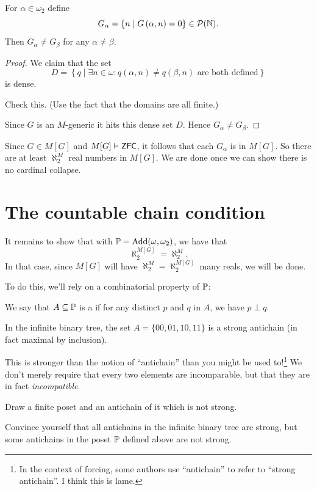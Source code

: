 \begin{lemma}
	For $\alpha \in \omega_2$ define
	\[ G_\alpha = \left\{ n \mid G\left( \alpha,n \right) = 0 \right\} \in \mathcal P(\mathbb N). \]
	Then $G_\alpha \neq G_\beta$ for any $\alpha \neq \beta$.
\end{lemma}
\begin{proof}
	We claim that the set
	\[ D = \left\{ q \mid \exists n \in \omega :
		q\left( \alpha, n \right) \neq q\left( \beta, n \right)
		\text{ are both defined}
	\right\} \]
	is dense.
	\begin{ques}
		Check this.
		(Use the fact that the domains are all finite.)
	\end{ques}

	Since $G$ is an $M$-generic it hits this dense set $D$.
	Hence $G_\alpha \neq G_\beta$.
\end{proof}

Since $G \in M[G]$ and $M[G] \vDash \mathsf{ZFC}$,
it follows that each $G_\alpha$ is in $M[G]$.
So there are at least $\aleph_2^M$ real numbers in $M[G]$.
We are done once we can show there is no cardinal collapse.

\section{The countable chain condition}
It remains to show that with $\mathbb P = \operatorname{Add}(\omega, \omega_2)$, we have that
\[ \aleph_2^{M[G]} = \aleph_2^M. \]
In that case, since $M[G]$ will have $\aleph_2^M = \aleph_2^{M[G]}$ many reals, we will be done.

To do this, we'll rely on a combinatorial property of $\mathbb P$:
\begin{definition}
	We say that $A \subseteq \mathbb P$ is a 
	if for any distinct $p$ and $q$ in $A$, we have $p \perp q$.
\end{definition}
\begin{example}
	In the infinite binary tree,
	the set $A = \{00, 01, 10, 11\}$ is a strong antichain
	(in fact maximal by inclusion).
\end{example}
This is stronger than the notion of ``antichain'' than you might be used to!\footnote{%
	In the context of forcing, some authors use ``antichain'' to refer to ``strong antichain''.
	I think this is lame.}
We don't merely require that every two elements are incomparable,
but that they are in fact \emph{incompatible}.
\begin{ques}
	Draw a finite poset and an antichain of it which is not strong.
\end{ques}
\begin{ques}
	Convince yourself that all antichains in the infinite binary tree are strong, but some
	antichains in the poset $\mathbb P$ defined above are not strong.
\end{ques}

